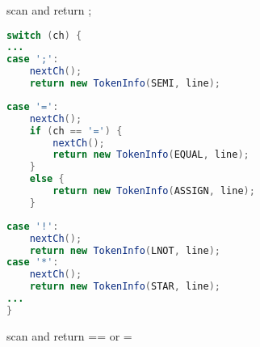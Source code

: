 \documentclass[8pt,a4paper,compress]{beamer}
\begin{document}
\begin{frame}[fragile]
\begin{overprint}
\begin{tcolorbox}[enhanced,drop shadow southwest,sharp corners,size=fbox,colback=white,fontlower=\small\ttfamily,collower=silver900]
\tcblower
\begin{minipage}[t][.25cm][t]{\textwidth}
scan and return ;
\end{minipage}
\end{tcolorbox}

\begin{tcolorbox}[enhanced,drop shadow southwest,sharp corners,size=fbox,colback=white,fontlower=\small\ttfamily,collower=silver900]

\begin{lstlisting}[language=Java,style=focusout]
switch (ch) {
...
case ';':
    nextCh();             
    return new TokenInfo(SEMI, line);         
\end{lstlisting}
\begin{lstlisting}[language=Java,style=focusin,backgroundcolor=\color{lime100}]
case '=':             
    nextCh();             
    if (ch == '=') {                 
        nextCh();                 
        return new TokenInfo(EQUAL, line);             
    }             
    else {                 
        return new TokenInfo(ASSIGN, line);             
    }         
\end{lstlisting}
\begin{lstlisting}[language=Java,style=focusout]
case '!':             
    nextCh();             
    return new TokenInfo(LNOT, line);         
case '*':             
    nextCh();             
    return new TokenInfo(STAR, line);
...
}
\end{lstlisting}

\tcblower
\begin{minipage}[t][.25cm][t]{\textwidth}
scan and return == or =
\end{minipage}
\end{tcolorbox}

\begin{tcolorbox}[enhanced,drop shadow southwest,sharp corners,size=fbox,colback=white,fontlower=\small\ttfamily,collower=silver900]


\end{tcolorbox}
\end{overprint}
\end{frame}
\end{document}
